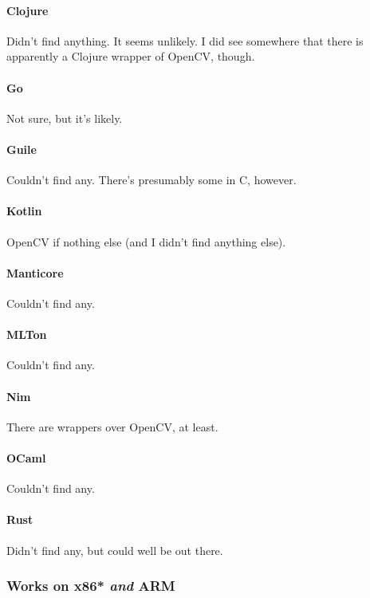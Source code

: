 \paragraph{Clojure}
Didn't find anything.  It seems unlikely.  I did see somewhere that there is apparently a Clojure wrapper of OpenCV, though.

\paragraph{Go}
Not sure, but it's likely.

\paragraph{Guile}
Couldn't find any.  There's presumably some in C, however.

\paragraph{Kotlin}
OpenCV if nothing else (and I didn't find anything else).

\paragraph{Manticore}
Couldn't find any.

\paragraph{MLTon}
Couldn't find any.

\paragraph{Nim}
There are wrappers over OpenCV, at least.

\paragraph{OCaml}
Couldn't find any.


\paragraph{Rust}
Didn't find any, but could well be out there.

\subsubsection{Works on x86* \emph{and} ARM}

